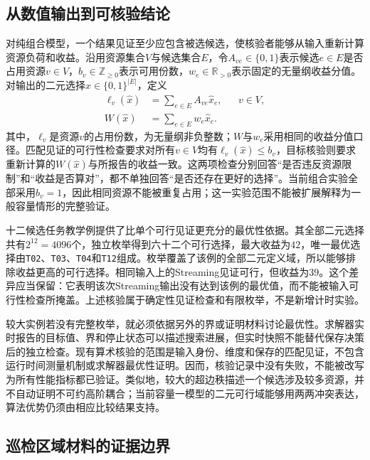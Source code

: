 \subsection{从数值输出到可核验结论}

对纯组合模型，一个结果见证至少应包含被选候选，使核验者能够从输入重新计算资源负荷和收益。沿用资源集合$V$与候选集合$E$，令$A_{ve}\in\{0,1\}$表示候选$e\in E$是否占用资源$v\in V$，$b_v\in\mathbb Z_{\geq0}$表示可用份数，$w_e\in\mathbb R_{>0}$表示固定的无量纲收益分值。对输出的二元选择$\widehat x\in\{0,1\}^{|E|}$，定义
\begin{align}
 \ell_v(\widehat x)
 &=\sum_{e\in E}A_{ve}\widehat x_e,
 &&v\in V,
 \label{s0104:checked_load}\\
 W(\widehat x)
 &=\sum_{e\in E}w_e\widehat x_e.
 \label{s0104:checked_value}
\end{align}
其中，$\ell_v$是资源$v$的占用份数，为无量纲非负整数；$W$与$w_e$采用相同的收益分值口径。匹配见证的可行性检查要求对所有$v\in V$均有$\ell_v(\widehat x)\leq b_v$，目标核验则要求重新计算的$W(\widehat x)$与所报告的收益一致。这两项检查分别回答“是否违反资源限制”和“收益是否算对”，都不单独回答“是否还存在更好的选择”。当前组合实验全部采用$b_v=1$，因此相同资源不能被重复占用；这一实验范围不能被扩展解释为一般容量情形的完整验证。

十二候选任务教学例提供了比单个可行见证更充分的最优性依据。其全部二元选择共有$2^{12}=4096$个，独立枚举得到六十二个可行选择，最大收益为$42$，唯一最优选择由\texttt{T02}、\texttt{T03}、\texttt{T04}和\texttt{T12}组成。枚举覆盖了该例的全部二元定义域，所以能够排除收益更高的可行选择。相同输入上的Streaming见证可行，但收益为$39$。这个差异应当保留：它表明该次Streaming输出没有达到该例的最优值，而不能被输入可行性检查所掩盖。上述核验属于确定性见证检查和有限枚举，不是新增计时实验。

较大实例若没有完整枚举，就必须依据另外的界或证明材料讨论最优性。求解器实时报告的目标值、界和停止状态可以描述搜索进展，但实时快照不能替代保存决策后的独立检查。现有算术核验的范围是输入身份、维度和保存的匹配见证，不包含运行时间测量机制或求解器最优性证明。因而，核验记录中没有失败，不能被改写为所有性能指标都已验证。类似地，较大的超边秩描述一个候选涉及较多资源，并不自动证明不可约高阶耦合；当前容量一模型的二元可行域能够用两两冲突表达，算法优势仍须由相应比较结果支持。

\subsection{巡检区域材料的证据边界}

